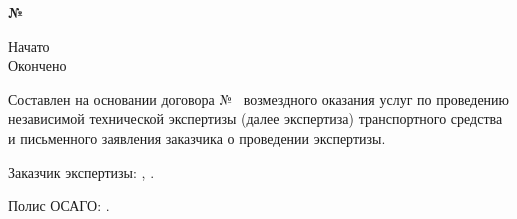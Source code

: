 \noindent \textbf{№ \NomerDoc}\hfill           \textbf{}\\%

\noindent\parbox[l][16mm]{16.5cm}
{\def\hrf#1{\hbox to#1{\hrulefill}}
	\noindent Начато\hfill            \datastart\\%
	Окончено\hfill                {}
}
\relax

%
%
%
\vspace{4mm}
Составлен на основании	договора № \NomerDoc\,  возмездного оказания услуг по проведению независимой технической экспертизы (далее экспертиза)  транспортного средства и письменного заявления заказчика о проведении экспертизы.

Заказчик  экспертизы: , . 

Полис ОСАГО: \polis.



